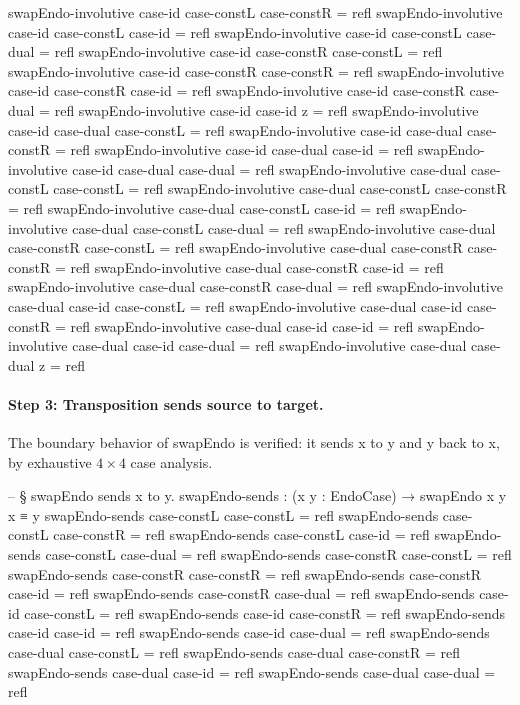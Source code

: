 \documentclass[11pt,a4paper]{book}
\def\texttt#1{#1}%
\begin{document}
\begin{code}
swapEndo-involutive case-id case-constL case-constR = refl
swapEndo-involutive case-id case-constL case-id     = refl
swapEndo-involutive case-id case-constL case-dual   = refl
swapEndo-involutive case-id case-constR case-constL = refl
swapEndo-involutive case-id case-constR case-constR = refl
swapEndo-involutive case-id case-constR case-id     = refl
swapEndo-involutive case-id case-constR case-dual   = refl
swapEndo-involutive case-id case-id z = refl
swapEndo-involutive case-id case-dual case-constL = refl
swapEndo-involutive case-id case-dual case-constR = refl
swapEndo-involutive case-id case-dual case-id     = refl
swapEndo-involutive case-id case-dual case-dual   = refl
swapEndo-involutive case-dual case-constL case-constL = refl
swapEndo-involutive case-dual case-constL case-constR = refl
swapEndo-involutive case-dual case-constL case-id     = refl
swapEndo-involutive case-dual case-constL case-dual   = refl
swapEndo-involutive case-dual case-constR case-constL = refl
swapEndo-involutive case-dual case-constR case-constR = refl
swapEndo-involutive case-dual case-constR case-id     = refl
swapEndo-involutive case-dual case-constR case-dual   = refl
swapEndo-involutive case-dual case-id     case-constL = refl
swapEndo-involutive case-dual case-id     case-constR = refl
swapEndo-involutive case-dual case-id     case-id     = refl
swapEndo-involutive case-dual case-id     case-dual   = refl
swapEndo-involutive case-dual case-dual z = refl
\end{code}

\paragraph{Step 3: Transposition sends source to target.}
The boundary behavior of \texttt{swapEndo} is verified: it sends \texttt{x} to \texttt{y} and \texttt{y} back to \texttt{x}, by exhaustive $4 \times 4$ case analysis.

\begin{code}
-- § swapEndo sends x to y.
swapEndo-sends : (x y : EndoCase) → swapEndo x y x ≡ y
swapEndo-sends case-constL case-constL = refl
swapEndo-sends case-constL case-constR = refl
swapEndo-sends case-constL case-id     = refl
swapEndo-sends case-constL case-dual   = refl
swapEndo-sends case-constR case-constL = refl
swapEndo-sends case-constR case-constR = refl
swapEndo-sends case-constR case-id     = refl
swapEndo-sends case-constR case-dual   = refl
swapEndo-sends case-id     case-constL = refl
swapEndo-sends case-id     case-constR = refl
swapEndo-sends case-id     case-id     = refl
swapEndo-sends case-id     case-dual   = refl
swapEndo-sends case-dual   case-constL = refl
swapEndo-sends case-dual   case-constR = refl
swapEndo-sends case-dual   case-id     = refl
swapEndo-sends case-dual   case-dual   = refl
\end{code}
\end{document}
